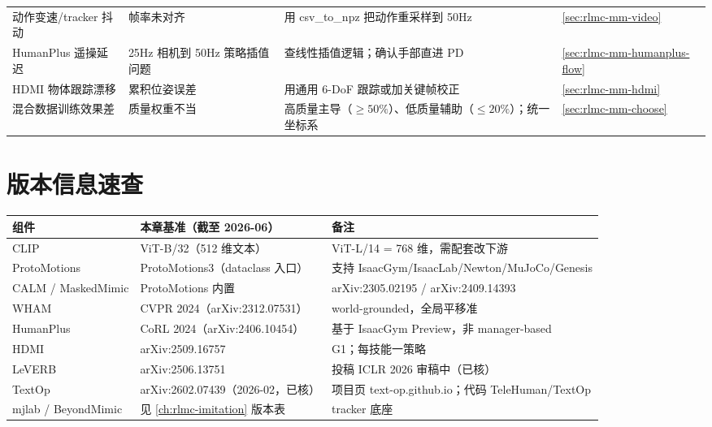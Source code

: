 \begin{center}
\begin{tabular}{@{}p{3.4cm}p{3.0cm}p{4.4cm}l@{}}
动作变速/tracker 抖动 & 帧率未对齐 & 用 csv\_to\_npz 把动作重采样到 50Hz & \cref{sec:rlmc-mm-video} \\
HumanPlus 遥操延迟 & 25Hz 相机到 50Hz 策略插值问题 & 查线性插值逻辑；确认手部直进 PD & \cref{sec:rlmc-mm-humanplus-flow} \\
HDMI 物体跟踪漂移 & 累积位姿误差 & 用通用 6-DoF 跟踪或加关键帧校正 & \cref{sec:rlmc-mm-hdmi} \\
混合数据训练效果差 & 质量权重不当 & 高质量主导（$\ge50\%$）、低质量辅助（$\le20\%$）；统一坐标系 & \cref{sec:rlmc-mm-choose} \\
\bottomrule
\end{tabular}
\end{center}

\section*{版本信息速查}
\label{sec:rlmc-mm-versions}

\begin{center}
\small
\begin{tabular}{@{}lll@{}}
\toprule
组件 & 本章基准（截至 2026-06） & 备注 \\
\midrule
CLIP & ViT-B/32（512 维文本） & ViT-L/14 = 768 维，需配套改下游 \\
ProtoMotions & ProtoMotions3（dataclass 入口） & 支持 IsaacGym/IsaacLab/Newton/MuJoCo/Genesis \\
CALM / MaskedMimic & ProtoMotions 内置 & arXiv:2305.02195 / arXiv:2409.14393 \\
WHAM & CVPR 2024（arXiv:2312.07531） & world-grounded，全局平移准 \\
HumanPlus & CoRL 2024（arXiv:2406.10454） & 基于 IsaacGym Preview，非 manager-based \\
HDMI & arXiv:2509.16757 & G1；每技能一策略 \\
LeVERB & arXiv:2506.13751 & 投稿 ICLR 2026 审稿中（已核） \\
TextOp & arXiv:2602.07439（2026-02，已核） & 项目页 text-op.github.io；代码 TeleHuman/TextOp \\
mjlab / BeyondMimic & 见 \cref{ch:rlmc-imitation} 版本表 & tracker 底座 \\
\bottomrule
\end{tabular}
\end{center}
